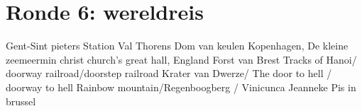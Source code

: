 
\section{Ronde 6: wereldreis}
\begin{questions}

\question[2] Gent-Sint pieters Station
\vspace{5mm}
\question[2] Val Thorens
\vspace{5mm}
\question[2] Dom van keulen
\vspace{5mm}
\question[2] Kopenhagen, De kleine zeemeermin
\vspace{5mm}
\question[2] christ church's great hall, England
\vspace{5mm}
\question[2] Forst van Brest
\vspace{5mm}
\question[2] Tracks of Hanoi/ doorway railroad/doorstep railroad
\vspace{5mm}
\question[2] Krater van Dwerze/ The door to hell / doorway to hell
\vspace{5mm}
\question[2] Rainbow mountain/Regenboogberg / Vinicunca
\vspace{5mm}
\question[2] Jeanneke Pis in brussel

\end{questions}
\newpage
